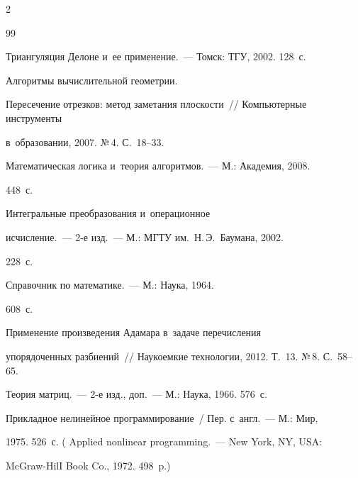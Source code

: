\begin{multicols}{2}
{{\begin{thebibliography}{99}


 Триангуляция Делоне и~ее применение.~--- Томск: ТГУ, 2002. 128~с.




 Алгоритмы вы\-чис\-ли\-тель\-ной гео\-мет\-рии. 


Пересечение отрезков: метод заметания плос\-кости~// Компьютерные инструменты 


в~образовании, 2007. №\,4. С.~18--33.




 Математическая логика и~тео\-рия алгоритмов.~--- М.: Академия, 2008. 


448~с.




 Интегральные преобразования и~операционное 


ис\-чис\-ле\-ние.~--- 2-е изд.~--- М.: МГТУ им.\ Н.\,Э.~Баумана, 2002. 


228~с.




 Справочник по математике.~--- М.: Наука, 1964. 


608~с.












 Применение произведения Адамара в~задаче пе\-ре\-чис\-ле\-ния 


упорядоченных разбиений~// Наукоемкие технологии, 2012. Т.~13. №\,8. С.~58--65.




 Тео\-рия мат\-риц.~--- 2-е изд., доп.~--- М.: Наука, 1966. 576~с.




 Прикладное нелинейное программирование~/ Пер. с~англ.~--- М.: Мир, 


1975. 526~с. ( Applied nonlinear programming.~--- New York, NY, USA: 


McGraw-HilI Book Co., 1972. 498~p.)


{





}


 \end{thebibliography}





 }


 }





\end{multicols}





